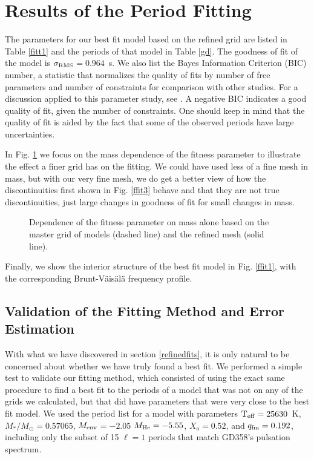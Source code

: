 \documentclass[12pt,preprint]{aastex}
\newcommand{\bvf}{Brunt-V\"ais\"al\"a }
\newcommand{\sigrms}{$\sigma_{\rm RMS}$}
\newcommand{\menv}{$M_{\rm env}$}
\begin{document}
\section{Results of the Period Fitting}
\label{results}

The parameters for our best fit model based on the refined grid are listed in Table \ref{fitt1} 
and the periods of that model in Table \ref{gd}. The goodness of fit of the model is \sigrms$=0.964$~s. 
We also list the Bayes Information Criterion (BIC) number, a statistic that
normalizes the quality of fits by number of free parameters and
number of constraints for comparison with other studies. For a discussion applied to this parameter
study, see \citet{Bischoff-Kim11a}. A negative BIC indicates a good quality of fit, given the number 
of constraints. One should keep in mind that the quality of fit is aided by the fact that some of 
the observed periods have large uncertainties.

In Fig. \ref{ffit4} we focus on the mass dependence of the fitness parameter to illustrate 
the effect a finer grid has on the fitting. We could have used less of a fine mesh in mass, 
but with our very fine mesh, we do get a better view of how the discontinuities first shown 
in Fig. \ref{ffit3} behave and that they are not true discontinuities, just large changes in 
goodness of fit for small changes in mass.

\begin{figure}
\caption{
Dependence of the fitness parameter on mass alone based on 
the master grid of models (dashed line) and the refined mesh (solid line). \label{ffit4}
}
\end{figure}


Finally, we show the interior structure of the best fit model in Fig. \ref{ffit1}, with the corresponding \bvf frequency profile.

\subsection{Validation of the Fitting Method and Error Estimation}

With what we have discovered in section \ref{refinedfits}, it is only natural to be concerned about whether we have truly 
found a best fit. We performed a simple test to validate our fitting method, which consisted of using the exact same procedure 
to find a best fit to the periods of a model that was not on any of the grids we calculated, but that did have parameters that 
were very close to the best fit model. We used the period list for a model with parameters 
${\rm T_{eff}}=25630$~K, $M_*/M_\odot=0.57065$, \menv $=-2.05$ $M_{\rm He}=-5.55$, $X_o=0.52$, and $q_{\rm fm}=0.192$, 
including only the subset of 15 $\ell=1$ periods that match GD358's pulsation spectrum.
\end{document}
